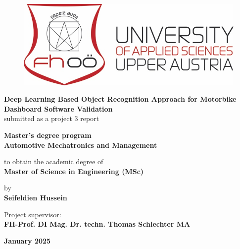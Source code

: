 \begin{titlepage}
    \begin{center}
        \vspace*{0.5cm}
        
        \begin{figure}
            \centering
            \includegraphics[width=0.75\linewidth]{Figures/FH_Logo.png}
        \end{figure}
        
        \Huge\textbf{Deep Learning Based Object Recognition Approach for Motorbike Dashboard Software Validation}\\
        
        \vspace{0.5cm}
        \large{submitted as a project 3 report}\\
        
        \vfill
        
        \textbf{Master's degree program}\\
        \textbf{Automotive Mechatronics and Management}\\
        
        \vspace{0.5cm}
        
        to obtain the academic degree of\\
        \textbf{Master of Science in Engineering (MSc)}\\
        
        \vfill
        
        by\\
        \textbf{Seifeldien Hussein}\\
        
        \vfill
        
        Project supervisor:\\
        \textbf{FH-Prof. DI Mag. Dr. techn. Thomas Schlechter MA} \\ 
        
        \vspace{0.8cm}
        
         \textbf{January 2025}
        
    \end{center}
\end{titlepage}
